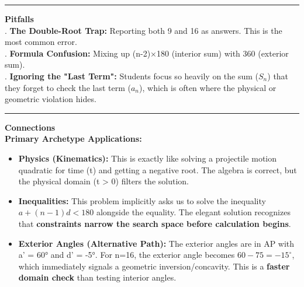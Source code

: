 \documentclass{article}
\begin{document}
\noindent \rule{\textwidth}{0.4pt}

\noindent \textbf{Pitfalls} \\

. \textbf{The Double-Root Trap:} Reporting both 9 and 16 as answers. This is the most common error. \\

. \textbf{Formula Confusion:} Mixing up (n-2)×180 (interior sum) with 360 (exterior sum). \\

. \textbf{Ignoring the "Last Term":} Students focus so heavily on the sum ($S_n$) that they forget to check the last term ($a_n$), which is often where the physical or geometric violation hides. \\

\noindent \rule{\textwidth}{0.4pt}

\noindent \textbf{Connections} \\

\noindent \textbf{Primary Archetype Applications:}
\begin{itemize}
    \item \textbf{Physics (Kinematics):} This is exactly like solving a projectile motion quadratic for time (t) and getting a negative root. The algebra is correct, but the physical domain (t > 0) filters the solution.
    \item \textbf{Inequalities:} This problem implicitly asks us to solve the inequality $a + (n-1)d < 180$ alongside the equality. The elegant solution recognizes that \textbf{constraints narrow the search space before calculation begins}.
    \item \textbf{Exterior Angles (Alternative Path):} The exterior angles are in AP with a' = 60° and d' = -5°. For n=16, the exterior angle becomes $60 - 75 = -15^\circ$, which immediately signals a geometric inversion/concavity. This is a \textbf{faster domain check} than testing interior angles.
\end{itemize}
\end{document}
